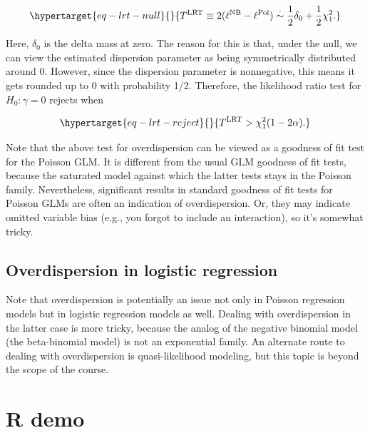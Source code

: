 \documentclass[
  11pt,
  letterpaper,
  oneside]{book}
\theoremstyle{plain}
\theoremstyle{plain}
\theoremstyle{definition}
\theoremstyle{definition}
\theoremstyle{plain}
\theoremstyle{remark}
\begin{document}
\begin{equation}\protect\hypertarget{eq-lrt-null}{}{
T^{\text{LRT}} \equiv 2(\ell^{\text{NB}} - \ell^{\text{Poi}}) \overset \cdot \sim \frac{1}{2}\delta_0 + \frac{1}{2}\chi^2_1.
}\label{eq-lrt-null}\end{equation}

Here, \(\delta_0\) is the delta mass at zero. The reason for this is
that, under the null, we can view the estimated dispersion parameter as
being symmetrically distributed around 0. However, since the dispersion
parameter is nonnegative, this means it gets rounded up to 0 with
probability 1/2. Therefore, the likelihood ratio test for
\(H_0: \gamma = 0\) rejects when

\begin{equation}\protect\hypertarget{eq-lrt-reject}{}{
T^{\text{LRT}} > \chi^2_1(1-2\alpha).
}\label{eq-lrt-reject}\end{equation}

Note that the above test for overdispersion can be viewed as a goodness
of fit test for the Poisson GLM. It is different from the usual GLM
goodness of fit tests, because the saturated model against which the
latter tests stays in the Poisson family. Nevertheless, significant
results in standard goodness of fit tests for Poisson GLMs are often an
indication of overdispersion. Or, they may indicate omitted variable
bias (e.g., you forgot to include an interaction), so it's somewhat
tricky.

\hypertarget{overdispersion-in-logistic-regression}{%
\section{Overdispersion in logistic
regression}\label{overdispersion-in-logistic-regression}}

Note that overdispersion is potentially an issue not only in Poisson
regression models but in logistic regression models as well. Dealing
with overdispersion in the latter case is more tricky, because the
analog of the negative binomial model (the beta-binomial model) is not
an exponential family. An alternate route to dealing with overdispersion
is quasi-likelihood modeling, but this topic is beyond the scope of the
course.

\hypertarget{sec-r-demo}{%
\chapter{R demo}\label{sec-r-demo}}
\end{document}
